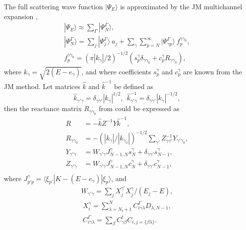 \documentclass[aip
, pra
, showpacs
, aps
, twocolumn
, groupedaddress
, floatfix
]{revtex4}
\newcommand{\beq}{\begin{equation}}
\newcommand{\eeq}{\end{equation}}
\newcommand{\barr}{\begin{array}}
\newcommand{\earr}{\end{array}}
\begin{document}
The full scattering wave function $|\Psi_E \rangle$ is approximated by the JM multichannel expansion
\cite{KB10p022708,KFB11},
\beq
\barr{l}
|\Psi_E \rangle \approx \sum_\Gamma | \Psi_N^{\Gamma} \rangle, \\
| \Psi_N^\Gamma \rangle =\sum_j | \Psi_j^\Gamma \rangle \ a_j
+ \sum_{\gamma} \sum_{p=N}^{\infty}
| \Psi_{\gamma p}^{\Gamma} \rangle \ f^{\gamma \gamma_0}_{p}, \\
f^{\gamma \gamma_0}_{p} = (\pi|k_{\gamma}|/2)^{-1/2} \left( s_{p}^{\gamma} \delta_{\gamma \gamma_0}
+ c_{p}^{\gamma} R_{\gamma \gamma_0} \right) ,
\earr \label{Psi_E_N} \eeq
where $k_{\gamma}=\sqrt{2(E-e_{\gamma})}$, and where coefficients $s_{p}^{\gamma}$ and $c_{p}^{\gamma}$
are known \cite{BR76p1491} from the JM method. Let matrices $\hat{k}$ and $\hat{k}^{-1}$ be defined as
\beq
\hat{k}_{\gamma' \gamma} =  \delta_{\gamma \gamma'} |k_{\gamma}|^{1/2}, \ \
\hat{k}_{\gamma' \gamma}^{-1} =  \delta_{\gamma \gamma'} |k_{\gamma}|^{-1/2},
\label{k_matrix} \eeq
then
the reactance matrix $R_{\gamma \gamma_0}$ from \cite{BR76p1491} could be expressed as
\beq \barr{rl}
R &= - \hat{k} Z^{-1}Y\hat{k}^{-1},\\
R_{\gamma \gamma_0} &= - (|k_{\gamma}|/|k_{\gamma_0}|)^{-1/2} \sum_{\gamma'} Z^{-1}_{\gamma \gamma'} Y_{\gamma' \gamma_0},\\
Y_{\gamma' \gamma} &=   W_{\gamma' \gamma} J_{N-1,N}^{\gamma} s_N^{\gamma}
+ \delta_{\gamma \gamma'}s_{N-1}^{\gamma}  ,\\
Z_{\gamma' \gamma} &=  W_{\gamma' \gamma}  J_{N-1,N}^{\gamma} c_N^{\gamma}
+ \delta_{\gamma \gamma'}c_{N-1}^{\gamma}   ,\\
\earr \label{R_matrix} \eeq
where $J_{p'p}^{\gamma} = \langle \xi_{p'} |K - (E-e_\gamma) | \xi_{p}  \rangle$, and
\beq \barr{l}
W_{\gamma' \gamma}= \sum_j  X_j^{\gamma'} X_j^{\gamma} / (E_j-E),
\earr \label{W_gg} \eeq
\beq \barr{l}
X_i^\gamma =  \sum_{\lambda=N_t+1}^N C_{i \gamma\lambda}^\Gamma D_{\lambda, N-1}, \\
C_{i\gamma\lambda}^\Gamma =  \sum_\beta  C^t_{\gamma\beta} C_{i, j=\{\beta \lambda\} } .
\earr \label{X_ig} \eeq
\end{document}
